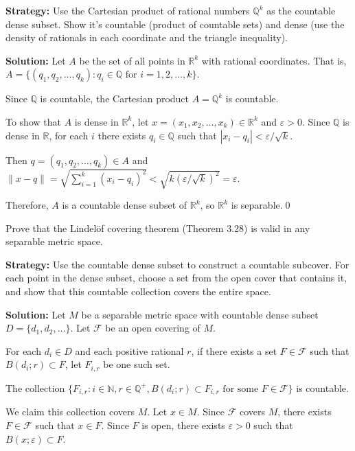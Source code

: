 \noindent\textbf{Strategy:} Use the Cartesian product of rational numbers $\mathbb{Q}^k$ as the countable dense subset. Show it's countable (product of countable sets) and dense (use the density of rationals in each coordinate and the triangle inequality).

\bigskip\noindent\textbf{Solution:} Let $A$ be the set of all points in $\mathbb{R}^k$ with rational coordinates. That is, $A = \{(q_1, q_2, \ldots, q_k) : q_i \in \mathbb{Q} \text{ for } i = 1,2,\ldots,k\}$.

Since $\mathbb{Q}$ is countable, the Cartesian product $A = \mathbb{Q}^k$ is countable.

To show that $A$ is dense in $\mathbb{R}^k$, let $x = (x_1, x_2, \ldots, x_k) \in \mathbb{R}^k$ and $\varepsilon > 0$. Since $\mathbb{Q}$ is dense in $\mathbb{R}$, for each $i$ there exists $q_i \in \mathbb{Q}$ such that $|x_i - q_i| < \varepsilon/\sqrt{k}$.

Then $q = (q_1, q_2, \ldots, q_k) \in A$ and $\|x - q\| = \sqrt{\sum_{i=1}^k (x_i - q_i)^2} < \sqrt{k(\varepsilon/\sqrt{k})^2} = \varepsilon$.

Therefore, $A$ is a countable dense subset of $\mathbb{R}^k$, so $\mathbb{R}^k$ is separable.\qed


\begin{problembox}
Prove that the Lindelöf covering theorem (Theorem 3.28) is valid in any separable metric space.
\end{problembox}

\noindent\textbf{Strategy:} Use the countable dense subset to construct a countable subcover. For each point in the dense subset, choose a set from the open cover that contains it, and show that this countable collection covers the entire space.

\bigskip\noindent\textbf{Solution:} Let $M$ be a separable metric space with countable dense subset $D = \{d_1, d_2, \ldots\}$. Let $\mathcal{F}$ be an open covering of $M$.

For each $d_i \in D$ and each positive rational $r$, if there exists a set $F \in \mathcal{F}$ such that $B(d_i;r) \subset F$, let $F_{i,r}$ be one such set.

The collection $\{F_{i,r} : i \in \mathbb{N}, r \in \mathbb{Q}^+, B(d_i;r) \subset F_{i,r} \text{ for some } F \in \mathcal{F}\}$ is countable.

We claim this collection covers $M$. Let $x \in M$. Since $\mathcal{F}$ covers $M$, there exists $F \in \mathcal{F}$ such that $x \in F$. Since $F$ is open, there exists $\varepsilon > 0$ such that $B(x;\varepsilon) \subset F$.

